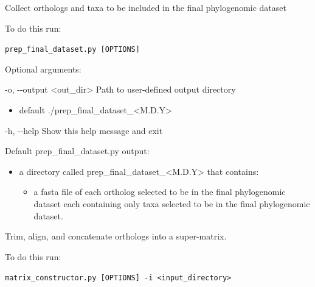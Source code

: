 \documentclass{article}
\def\code#1{\texttt{#1}}
\begin{document}
\begin{enumerate}[itemsep=12pt]
    \item Collect orthologs and taxa to be included in the final phylogenomic dataset
    
    \vspace{0.2cm}
    To do this run:
    
    \vspace{0.2cm}
    \code{prep\_final\_dataset.py [OPTIONS]}
    \vspace{0.2cm}
    
    \begin{description}
        \item Optional arguments:
        \begin{description}
            \item -o, -\/-output \hspace{0.2cm} <out\_dir>  \hspace{0.2cm} Path to user-defined output directory
            \begin{itemize}
                \item default ./prep\_final\_dataset\_<M.D.Y>
            \end{itemize}
            \item -h, -\/-help \hspace{0.2cm} Show this help message and exit
        \end{description}
        
    \vspace{0.2cm}
    \item{Default prep\_final\_dataset.py  output:}
    \begin{itemize}
        \item a directory called prep\_final\_dataset\_<M.D.Y> that contains:
        \begin{itemize}
            \item a fasta file of each ortholog selected to be in the final phylogenomic dataset each containing only taxa selected to be in the final phylogenomic dataset.
        \end{itemize}
    \end{itemize}
    \end{description}
    
    \item Trim, align, and concatenate orthologs into a super-matrix.
    
    \vspace{0.2cm}
    To do this run:
    
    \vspace{0.2cm}
    \code{matrix\_constructor.py [OPTIONS] -i <input\_directory>}
    \vspace{0.2cm}
    

\end{enumerate}
\end{document}
